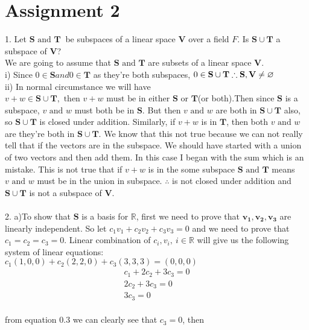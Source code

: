 \documentclass[10pt,a4paper]{article}
\numberwithin{equation}{section}
\begin{document}
\section*{Assignment 2}
1.
Let $\mathbf{S} \text{ and } \mathbf{T}~$ be subspaces of a linear space $\mathbf{V}$ over a field $F$. Is $\mathbf{S} \cup \mathbf{T}$ a subspace of $\mathbf{V}$? \\
We are going to assume that $\mathbf{S} \text{ and } \mathbf{T}$ are subsets of a linear space $\mathbf{V}$. \\
i) Since $0 \in \mathbf{S} and 0 \in \mathbf{T}$ as they're both subspaces, $0 \in \mathbf{S} \cup \mathbf{T} \\ \therefore \mathbf{S,V} \neq \varnothing$ \\
ii) In normal circumstance we will have $v+w \in \mathbf{S} \cup \mathbf{T}, \text{ then } v +w \text{ must be in either } \mathbf{S } \text{ or } \mathbf{ T}$(or both).Then since $\mathbf{S }$ is a subspace, $v \text{ and } w$ must both be in $\mathbf{S}$. But then $v \text{ and } w$ are both in $\mathbf{S}\cup \mathbf{T}$ also, so $\mathbf{S} \cup \mathbf{T}$ is closed under addition. Similarly, if $v + w$ is in $\mathbf{T}$, then both
$v \text{ and } w$ are they're both in $\mathbf{S}\cup \mathbf{T}$. We know that this not true because we can not really tell that if the vectors are in the subspace. We should have started with a union of two vectors and then add them. In this case I began with the sum which is an mistake. This is not true that if $v+w$ is in the some subspace $\mathbf{S} \text{ and } \mathbf{T}$ means $v \text{ and }w$ must be in the union in subspace. $ \therefore$ is not closed under addition and $\mathbf{S} \cup \mathbf{T}$ is not a subspace of $\mathbf{V}$. \\
~\\
2.
a)To show that $\mathbf{S}$ is a basis for $\mathbb{R}$, first we need to prove that $\mathbf{v_1,v_2,v_3}$ are linearly independent. So let $c_{1}v_{1}+c_{2}v_{2}+c_{3}v_{3}=0$ and we need to prove that $c_{1}=c_{2}=c_{3}=0$. Linear combination of $c_{i},v_{i},~ i \in \mathbb{R}$ will give us the following system of linear equations: \\
$c_{1}(1,0,0)+c_{2}(2,2,0)+c_{3}(3,3,3)=(0,0,0)$
\begin{align}
c_{1}+2c_{2}+3c_{3}=0 \\
2c_{2}+3c_{3}=0 \\
3c_{3}=0
\end{align} \\
from equation 0.3 we can clearly see that $c_{3}=0$, then \\
\end{document}

